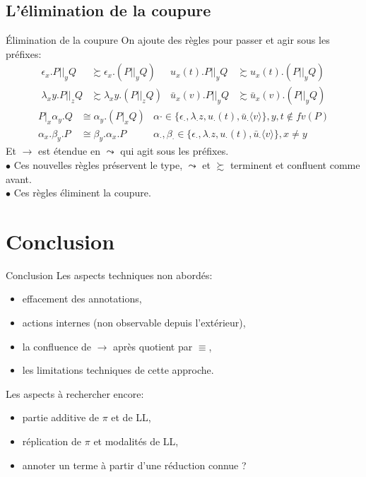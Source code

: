 \documentclass[11pt]{beamer}
\begin{document}
\subsection{L'élimination de la coupure}

\begin{frame}{Élimination de la coupure}
On ajoute des règles pour passer et agir sous les préfixes:
\begin{align*}
\epsilon_x.P||_yQ &\succsim \epsilon_x.(P||_yQ) & u_x(t).P||_yQ &\succsim u_x(t).(P||_yQ)\\
\lambda_xy.P||_zQ &\succsim \lambda_xy.(P||_zQ) & \bar{u}_x(v).P||_yQ &\succsim \bar{u}_x(v).(P||_yQ)
\end{align*}
\begin{align*}
P|_x \alpha_y.Q &\cong \alpha_y.(P|_xQ) & \alpha\cdot \in \{\epsilon_\cdot,\lambda_\cdot z,u_\cdot(t),\bar{u}_\cdot\langle v\rangle\}, y,t\not\in fv(P)\\
\alpha_x.\beta_y.P &\cong \beta_y.\alpha_x.P & \alpha_\cdot,\beta_\cdot \in \{\epsilon_\cdot,\lambda_\cdot z,u_\cdot(t),\bar{u}_\cdot\langle v\rangle\},x\neq y
\end{align*}
Et $\to$ est étendue en $\leadsto$ qui agit sous les préfixes.\\
\pause$\bullet$ Ces nouvelles règles préservent le type, $\leadsto$ et $\succsim$ terminent et confluent comme avant.\\
\pause$\bullet$ Ces règles éliminent la coupure.
\end{frame}

\section{Conclusion}

\begin{frame}{Conclusion}
Les aspects techniques non abordés:
\begin{itemize}
\item effacement des annotations,
\item actions internes (non observable depuis l'extérieur),
\item la confluence de $\to$ après quotient par $\equiv$,
\item les limitations techniques de cette approche.
\end{itemize}
Les aspects à rechercher encore:
\begin{itemize}
\item partie additive de $\pi$ et de LL,
\item réplication de $\pi$ et modalités de LL,
\item annoter un terme à partir d'une réduction connue ?
\end{itemize}
\end{frame}
\end{document}
